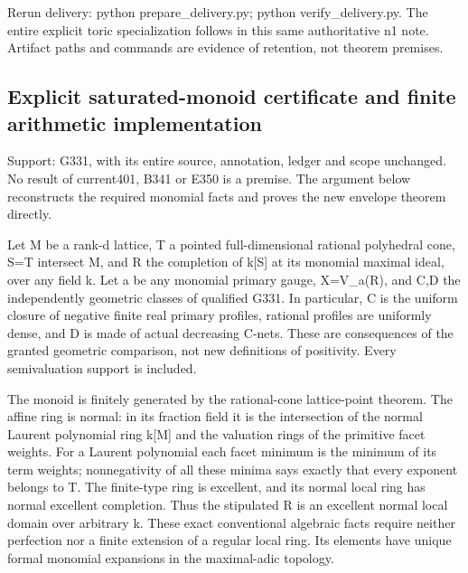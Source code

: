 \documentclass[11pt]{article}
\begin{document}
Rerun delivery: python prepare\_delivery.py; python verify\_delivery.py. The entire explicit toric specialization follows in this same authoritative n1 note. Artifact paths and commands are evidence of retention, not theorem premises.

\subsection{Explicit saturated-monoid certificate and finite arithmetic implementation}

Support: G331, with its entire source, annotation, ledger and scope unchanged. No result of current401, B341 or E350 is a premise. The argument below reconstructs the required monomial facts and proves the new envelope theorem directly.

Let M be a rank-d lattice, T a pointed full-dimensional rational polyhedral cone, S=T intersect M, and R the completion of k[S] at its monomial maximal ideal, over any field k. Let a be any monomial primary gauge, X=V\_a(R), and C,D the independently geometric classes of qualified G331. In particular, C is the uniform closure of negative finite real primary profiles, rational profiles are uniformly dense, and D is made of actual decreasing C-nets. These are consequences of the granted geometric comparison, not new definitions of positivity. Every semivaluation support is included.

The monoid is finitely generated by the rational-cone lattice-point theorem. The affine ring is normal: in its fraction field it is the intersection of the normal Laurent polynomial ring k[M] and the valuation rings of the primitive facet weights. For a Laurent polynomial each facet minimum is the minimum of its term weights; nonnegativity of all these minima says exactly that every exponent belongs to T. The finite-type ring is excellent, and its normal local ring has normal excellent completion. Thus the stipulated R is an excellent normal local domain over arbitrary k. These exact conventional algebraic facts require neither perfection nor a finite extension of a regular local ring. Its elements have unique formal monomial expansions in the maximal-adic topology.
\end{document}
